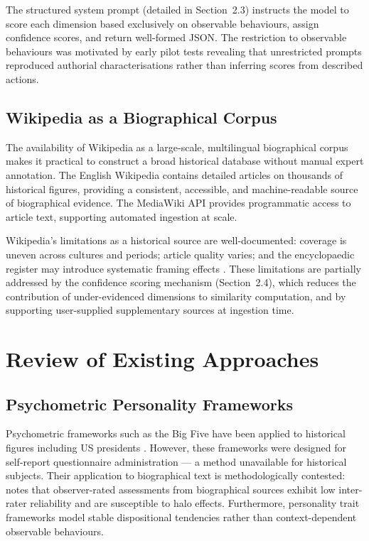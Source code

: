 \documentclass[11pt, a4paper]{report}
\begin{document}
The structured system prompt (detailed in Section~2.3) instructs the model to score each dimension based exclusively on observable behaviours, assign confidence scores, and return well-formed JSON. The restriction to observable behaviours was motivated by early pilot tests revealing that unrestricted prompts reproduced authorial characterisations rather than inferring scores from described actions.

\subsection{Wikipedia as a Biographical Corpus}

The availability of Wikipedia as a large-scale, multilingual biographical corpus makes it practical to construct a broad historical database without manual expert annotation. The English Wikipedia contains detailed articles on thousands of historical figures, providing a consistent, accessible, and machine-readable source of biographical evidence. The MediaWiki API provides programmatic access to article text, supporting automated ingestion at scale.

Wikipedia's limitations as a historical source are well-documented: coverage is uneven across cultures and periods; article quality varies; and the encyclopaedic register may introduce systematic framing effects \citep{halavais2004}. These limitations are partially addressed by the confidence scoring mechanism (Section~2.4), which reduces the contribution of under-evidenced dimensions to similarity computation, and by supporting user-supplied supplementary sources at ingestion time.

\section{Review of Existing Approaches}

\subsection{Psychometric Personality Frameworks}

Psychometric frameworks such as the Big Five \citep{costa1992} have been applied to historical figures including US presidents \citep{rubenzer2000}. However, these frameworks were designed for self-report questionnaire administration — a method unavailable for historical subjects. Their application to biographical text is methodologically contested: \citet{revelle2009} notes that observer-rated assessments from biographical sources exhibit low inter-rater reliability and are susceptible to halo effects. Furthermore, personality trait frameworks model stable dispositional tendencies rather than context-dependent observable behaviours.
\end{document}
